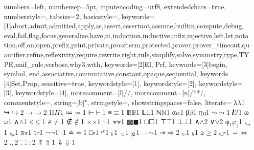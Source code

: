 {
  numbers=left,
  numbersep=5pt,
  inputencoding=utf8,
  extendedchars=true,
  numberstyle=\footnotesize,
  tabsize=2,
  basicstyle={\ttfamily\scriptsize\upshape},
  keywords=[1]{abort,admit,admitted,apply,as,assert,assertnot,assume,builtin,compute,debug, eval,fail,flag,focus,generalize,have,in,induction,inductive,infix,injective,left,let,notation,off,on,open,prefix,print,private,proofterm,protected,prover,prover_timeout,quantifier,refine,reflexivity,require,rewrite,right,rule,simplify,solve,symmetry,type,TYPE,unif_rule,verbose,why3,with},
  keywords=[2]{El, Prf},
  keywords=[3]{begin, symbol, end,associative,commutative,constant,opaque,sequential},
  keywords=[4]{Set,Prop},
  sensitive=true,
  keywordstyle={[1]\bfseries\color{purple}},
  keywordstyle={[2]\bfseries\color{purple}},
  keywordstyle={[3]\bfseries\color{violet}},
  keywordstyle={[4]\bfseries\color{blue}},
  morecomment=[l]{//},
  morecomment=[n]{/*}{*/},
  commentstyle={\itshape\color{teal}},
  string=[b]{"},
  stringstyle=\color{orange},
  showstringspaces=false,
  literate=
  {λ}{$\lambda$}1
  {↪}{$\hookrightarrow$}2
  {→}{$\rightarrow$}2
  {Π}{$\Pi$}1
  {≔}{$\coloneqq$}1
  {⊢}{$\vdash$}1
  {≡}{$\equiv$}1
  {𝔹}{$\mathbb{B}$}1
  {𝕃}{$\mathbb{L}$}1
  {ℕ}{$\mathbb{N}$}1
  {α}{$\alpha$}1
  {β}{$\beta$}1
  {η}{$\eta$}1
  {⤳}{$\rightcurvedarrow$}1
  {𝑰}{$\mathcal{I}$}1
  {ω}{$\omega$}1
  {∧}{$\wedge$}1
  {≤}{$\le$}1
  {≠}{$\neq$}1
  {∉}{$\notin$}1
  {×}{$\times$}1
  {⋅}{$\cdot$}1
  {⟇}{$\veedot$}1
  {▩}{$\blacksquare$}1
  {□}{$\Square$}1
  {⊤}{$\top$}1
  {⊥}{$\bot$}1
  {∧}{$\land$}2
  {∨}{$\lor$}2
  {φ₁}{$\varphi_1$}1
  {ₙ}{$_n$}1
  {ₖ}{$_k$}1
  {π}{$\pi$}1
  {τ}{$\tau$}1
  {¬}{$\neg$}1
  { ̇}{$\cdot$}1
  {≐}{$\doteq$}1
  {□}{$\square$}1
  {ᶜ}{${^c}$}1
  {ᵢ}{$_{\!i}$}1
  {₁}{$_{\!1}$}1
  {₂}{$_{\!2}$}1
  {—}{$\sim$}1
  {⇒}{$\Rightarrow$}2
  {ₑ}{${_e}$}1
  {ₗ}{${_l}$}1
  {≥}{$\geq$}2
  {ᵣ}{$\_r$}1
  {⇔}{$\Leftrightarrow$}2
  {‚}{$,$}2
  {⸬}{$\colon\colon$}2
  {⇑}{$\Uparrow$}1
  {⇓}{$\Downarrow$}1
}


\newcommand\smtinline[1]{\lstinline[language=SMT,basicstyle=\ttfamily\normalsize]|#1|}
\newcommand\lpinline[1]{\lstinline[language=Lambdapi,basicstyle=\ttfamily\normalsize]|#1|}